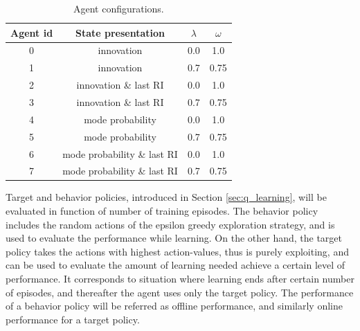 \documentclass[english, 12pt, a4paper, elec, utf8, a-1b, online]{aaltothesis}
\begin{document}
\begin{table}[t]
    \centering
    \begin{tabular}{|c | c | c |c |}
        \hline
        \textbf{Agent id} & \textbf{State presentation}  & $\lambda$  &  $\omega$ \\
        \hline
        0 & innovation & 0.0 & 1.0 \\ \hline
        1 & innovation & 0.7 & 0.75 \\ \hline
        2 & innovation \& last RI &  0.0 & 1.0 \\ \hline
        3 & innovation \& last RI & 0.7 & 0.75 \\ \hline
        4 & mode probability &  0.0 & 1.0 \\ \hline
        5 & mode probability & 0.7 & 0.75 \\ \hline 
        6 & mode probability \& last RI &  0.0 & 1.0 \\ \hline 
        7 & mode probability \& last RI & 0.7 & 0.75 \\
        \hline
    \end{tabular}
    \caption{Agent configurations.}
    \label{tab:agent_configurations}
\end{table}

Target and behavior policies, introduced in Section \ref{sec:q_learning}, will be evaluated in function of number of training episodes.
The behavior policy includes the random actions of the epsilon greedy exploration strategy, and is used to evaluate the performance while learning.
On the other hand, the target policy takes the actions with highest action-values, thus is purely exploiting, and can be used to evaluate the amount of learning needed achieve a certain level of performance.
It corresponds to situation where learning ends after certain number of episodes, and thereafter the agent uses only the target policy.
The performance of a behavior policy will be referred as offline performance, and similarly online performance for a target policy.
\end{document}

